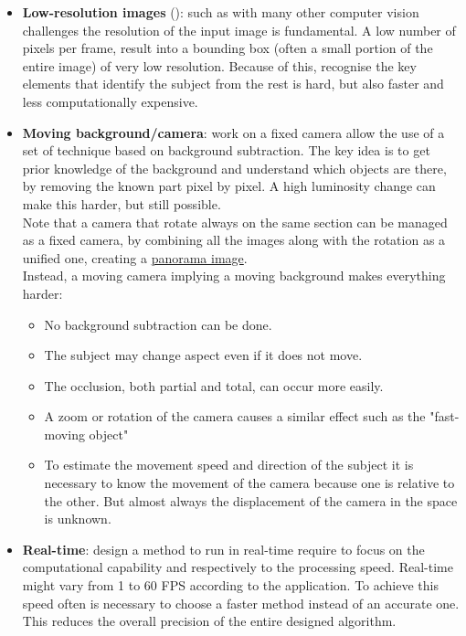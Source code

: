 \begin{itemize}
	\item \textbf{Low-resolution images} (): such as with many other computer vision challenges the resolution of the input image is fundamental. A low number of pixels per frame, result into a bounding box (often a small portion of the entire image) of very low resolution. Because of this, recognise the key elements that identify the subject from the rest is hard, but also faster and less computationally expensive.

	\item \textbf{Moving background/camera}: work on a fixed camera allow the use of a set of technique based on background subtraction. The key idea is to get prior knowledge of the background and understand which objects are there, by removing the known part pixel by pixel. A high luminosity change can make this harder, but still possible.\\
	Note that a camera that rotate always on the same section can be managed as a fixed camera, by combining all the images along with the rotation as a unified one, creating a \underline{panorama image}.\\
	Instead, a moving camera implying a moving background makes everything harder:
	\begin{itemize}
		\item No background subtraction can be done.
		\item The subject may change aspect even if it does not move.
		\item The occlusion, both partial and total, can occur more easily.
		\item A zoom or rotation of the camera causes a similar effect such as the "fast-moving object"
		\item To estimate the movement speed and direction of the subject it is necessary to know the movement of the camera because one is relative to the other. But almost always the displacement of the camera in the space is unknown.
	\end{itemize}

	\item \textbf{Real-time}: design a method to run in real-time require to focus on the computational capability and respectively to the processing speed. Real-time might vary from 1 to 60 FPS according to the application. To achieve this speed often is necessary to choose a faster method instead of an accurate one. This reduces the overall precision of the entire designed algorithm.\\


\end{itemize}
